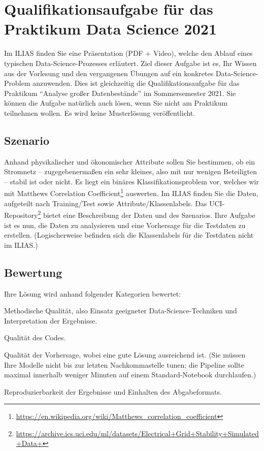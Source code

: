 \documentclass[headinclude,headsepline]{scrartcl}
\begin{document}
\section{Qualifikationsaufgabe für das Praktikum Data Science 2021}

Im ILIAS finden Sie eine Präsentation (PDF + Video), welche den Ablauf eines typischen Data-Science-Prozesses erläutert.
Ziel dieser Aufgabe ist es, Ihr Wissen aus der Vorlesung und den vergangenen Übungen auf ein konkretes Data-Science-Problem anzuwenden.
Dies ist gleichzeitig die Qualifikationsaufgabe für das Praktikum ``Analyse großer Datenbestände'' im Sommersemester 2021.
Sie können die Aufgabe natürlich auch lösen, wenn Sie nicht am Praktikum teilnehmen wollen.
Es wird keine Musterlösung veröffentlicht.

\subsection{Szenario}

Anhand physikalischer und ökonomischer Attribute sollen Sie bestimmen, ob ein Stromnetz  -- zugegebenermaßen ein sehr kleines, also mit nur wenigen Beteiligten -- stabil ist oder nicht.
Es liegt ein binäres Klassifikationsproblem vor, welches wir mit Matthews Correlation Coefficient\footnote{\url{https://en.wikipedia.org/wiki/Matthews_correlation_coefficient}} auswerten.
Im ILIAS finden Sie die Daten, aufgeteilt nach Training/Test sowie Attribute/Klassenlabels.
Das UCI-Repository\footnote{\url{https://archive.ics.uci.edu/ml/datasets/Electrical+Grid+Stability+Simulated+Data+}} bietet eine Beschreibung der Daten und des Szenarios.
Ihre Aufgabe ist es nun, die Daten zu analysieren und eine Vorhersage für die Testdaten zu erstellen.
(Logischerweise befinden sich die Klassenlabels für die Testdaten nicht im ILIAS.)

\subsection{Bewertung}

Ihre Lösung wird anhand folgender Kategorien bewertet:

\begin{compactenum}
	\item
	Methodische Qualität, also Einsatz geeigneter Data-Science-Techniken und Interpretation der Ergebnisse.
	\item
	Qualität des Codes.
	\item
	Qualität der Vorhersage, wobei eine gute Lösung ausreichend ist.
	(Sie müssen Ihre Modelle nicht bis zur letzten Nachkommastelle tunen; die Pipeline sollte maximal innerhalb weniger Minuten auf einem Standard-Notebook durchlaufen.)
	\item
	Reproduzierbarkeit der Ergebnisse und Einhalten des Abgabeformats.
\end{compactenum}
\end{document}
